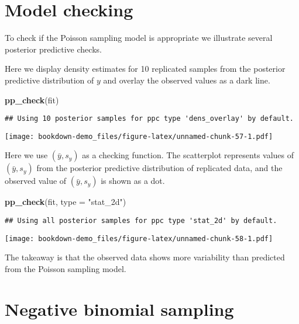 \documentclass[
]{book}
\newenvironment{Shaded}{\begin{snugshade}}{\end{snugshade}}
\newcommand{\DataTypeTok}[1]{\textcolor[rgb]{0.13,0.29,0.53}{#1}}
\newcommand{\KeywordTok}[1]{\textcolor[rgb]{0.13,0.29,0.53}{\textbf{#1}}}
\newcommand{\NormalTok}[1]{#1}
\newcommand{\StringTok}[1]{\textcolor[rgb]{0.31,0.60,0.02}{#1}}
\begin{document}
\hypertarget{model-checking}{%
\section{Model checking}\label{model-checking}}

To check if the Poisson sampling model is appropriate we illustrate several posterior predictive checks.

Here we display density estimates for 10 replicated samples from the posterior predictive distribution of \(y\) and overlay the observed values as a dark line.

\begin{Shaded}
\begin{Highlighting}[]
\KeywordTok{pp_check}\NormalTok{(fit)}
\end{Highlighting}
\end{Shaded}

\begin{verbatim}
## Using 10 posterior samples for ppc type 'dens_overlay' by default.
\end{verbatim}

\texttt{[image: bookdown-demo\_files/figure-latex/unnamed-chunk-57-1.pdf]}

Here we use \((\bar y, s_y)\) as a checking function. The scatterplot represents values of \((\bar y, s_y)\) from the posterior predictive distribution of replicated data, and the observed value of \((\bar y, s_y)\) is shown as a dot.

\begin{Shaded}
\begin{Highlighting}[]
\KeywordTok{pp_check}\NormalTok{(fit, }\DataTypeTok{type =} \StringTok{"stat_2d"}\NormalTok{)}
\end{Highlighting}
\end{Shaded}

\begin{verbatim}
## Using all posterior samples for ppc type 'stat_2d' by default.
\end{verbatim}

\texttt{[image: bookdown-demo\_files/figure-latex/unnamed-chunk-58-1.pdf]}

The takeaway is that the observed data shows more variability than predicted from the Poisson sampling model.

\hypertarget{negative-binomial-sampling}{%
\section{Negative binomial sampling}\label{negative-binomial-sampling}}
\end{document}
